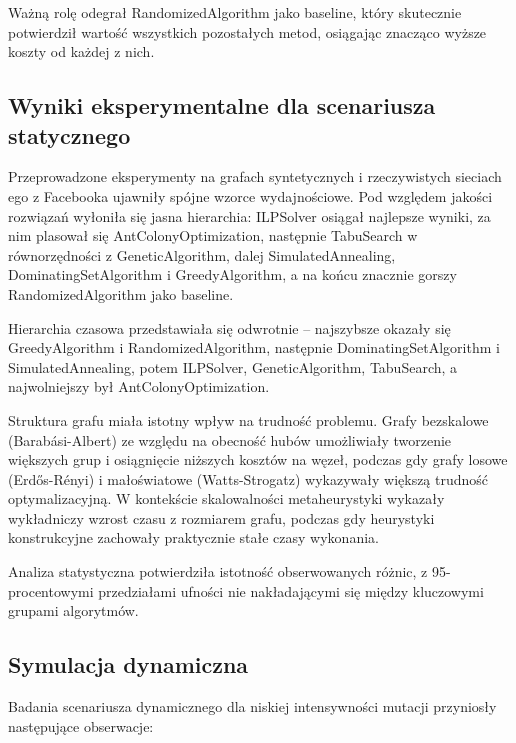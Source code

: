 Ważną rolę odegrał RandomizedAlgorithm jako baseline, który skutecznie potwierdził wartość wszystkich pozostałych metod, osiągając znacząco wyższe koszty od każdej z nich.

\subsection{Wyniki eksperymentalne dla scenariusza statycznego}

Przeprowadzone eksperymenty na grafach syntetycznych i rzeczywistych sieciach ego z Facebooka ujawniły spójne wzorce wydajnościowe. Pod względem jakości rozwiązań wyłoniła się jasna hierarchia: ILPSolver osiągał najlepsze wyniki, za nim plasował się AntColonyOptimization, następnie TabuSearch w równorzędności z GeneticAlgorithm, dalej SimulatedAnnealing, DominatingSetAlgorithm i GreedyAlgorithm, a na końcu znacznie gorszy RandomizedAlgorithm jako baseline.

Hierarchia czasowa przedstawiała się odwrotnie -- najszybsze okazały się GreedyAlgorithm i RandomizedAlgorithm, następnie DominatingSetAlgorithm i SimulatedAnnealing, potem ILPSolver, GeneticAlgorithm, TabuSearch, a najwolniejszy był AntColonyOptimization.

Struktura grafu miała istotny wpływ na trudność problemu. Grafy bezskalowe (Barabási-Albert) ze względu na obecność hubów umożliwiały tworzenie większych grup i osiągnięcie niższych kosztów na węzeł, podczas gdy grafy losowe (Erdős-Rényi) i małoświatowe (Watts-Strogatz) wykazywały większą trudność optymalizacyjną. W kontekście skalowalności metaheurystyki wykazały wykładniczy wzrost czasu z rozmiarem grafu, podczas gdy heurystyki konstrukcyjne zachowały praktycznie stałe czasy wykonania.

Analiza statystyczna potwierdziła istotność obserwowanych różnic, z 95-procentowymi przedziałami ufności nie nakładającymi się między kluczowymi grupami algorytmów.

\subsection{Symulacja dynamiczna}

Badania scenariusza dynamicznego dla niskiej intensywności mutacji przyniosły następujące obserwacje:


